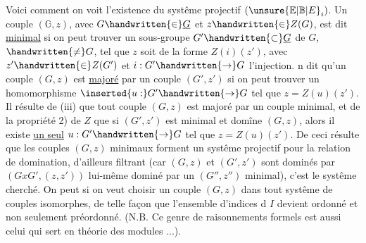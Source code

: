 

Voici comment on voit l'existence du systême projectif $(\unsure{\mathbb{E}|\mathbb{B}|E}_i)$. Un couple $(\mathbb{G},z)$, avec $G\handwritten{\in}\underline{G}$ et $z\handwritten{\in}Z(G)$, est dit \uline{minimal} si on  peut trouver un sous-groupe $G'\handwritten{\subset}\underline{G}$ de $G$,  $\handwritten{\ne}G$, tel que $z$ soit  de la forme $Z(i)(z')$, avec $z'\handwritten{\in}Z(G')$ et $i:G'\handwritten{\to}G$ l'injection.  n dit qu'un couple $(G,z)$ est \uline{majoré} par un couple $(G',z')$ si on peut trouver un homomorphisme $\inserted{u:}G'\handwritten{\to}G$ tel que $z=Z(u)(z')$. Il résulte de (iii) que tout couple $(G,z)$ est majoré par un couple minimal, et de la propriété 2) de $Z$ que si $(G',z')$ est minimal et domîne $(G,z)$, alors il existe \uline{un seul} $u:G'\handwritten{\to}G$ tel que $z=Z(u)(z')$. De ceci résulte que les couples $(G,z)$ minimaux forment un systême projectif pour la relation de domination, d'ailleurs filtrant (car $(G,z)$ et $(G',z')$ sont dominés par $(GxG',(z,z'))$ lui-même dominé par un $(G'',z'')$ minimal), c'est le systême cherché. On peut si on veut choisir un couple $(G,z)$ dans tout systême de couples  isomorphes, de  telle façon que l'ensemble d'indices d $I$ devient ordonné et non seulement préordonné. (N.B. Ce genre de raisonnements formels est aussi celui qui sert en théorie des  modules ...).

